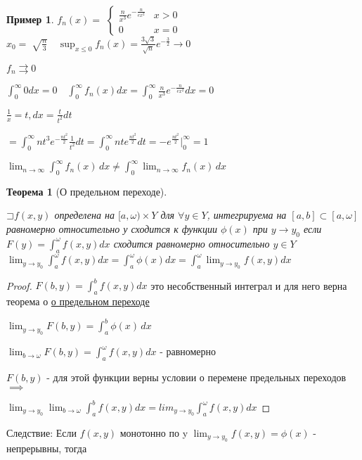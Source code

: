 \documentclass[a4paper, 12pt]{article}
\newcommand\letsymbol{\mathord{\sqsupset}}
\newtheorem{theorem}{Теорема}[section]
\theoremstyle{definition}
\newtheorem*{example}{Пример}
\theoremstyle{remark}
\begin{document}
\begin{example}
     $f_n(x) = $
     $\begin{cases}
          \frac{n}{x^3}e^{-\frac{n}{ex^2}} &\text{$x>0$}\\
          0 &\text{$x = 0$}
        \end{cases}$
     $x_0 = \sqrt[]{\frac{n}{3}}\quad \sup_{x\leq 0}f_n(x) = \frac{3\sqrt{3}}{\sqrt{n}}e^{-\frac{3}{2}}\to 0$

     $f_n\rightrightarrows 0$

     $\int_0^\infty 0dx = 0\quad \int_0^\infty f_n(x) dx = \int_0^\infty \frac{n}{x^3}e^{-\frac{n}{ex^2}}dx = 0$

     $\frac{1}{x} = t, dx = \frac{t}{t^2}dt$

     $=  \int_0^\infty nt^3 e^{-\frac{nt^2}{2}}\frac{1}{t^2}dt =  \int_0^\infty nte^{\frac{nt^2}{2}}dt = - e^{\frac{nt^2}{2}}{\Bigg |}_0^\infty = 1$

     $\lim_{n \to \infty}  \int_{0}^{\infty} f_n(x) \,dx \neq \int_{0}^{\infty} \lim_{n \to \infty}f_n(x) \,dx$
\end{example}

\begin{theorem}[О предельном переходе] \hypertarget{p4}{}
     $\letsymbol{}f(x,y)$ определена на $[a,\omega)\times Y$ для $\forall y\in Y$, интегрируема на $[a,b]\subset[a, \omega]$ равномерно относительно у сходится к функции $\phi(x)$ при $y\to y_0$ если $F(y) = \int_a^\omega f(x,y)dx$ 
     сходится равномерно относительно $y\in Y$
     $\lim_{y \to y_0}  \int_a^\omega  f(x,y)dx = \int_a^\omega  \phi(x)dx = \int_a^\omega  \lim_{y \to y_0}  f(x,y)dx$ 
\end{theorem}

\begin{proof}
     $F(b, y) = \int_a^b f(x,y)dx$ это несобственный интеграл и для него верна теорема о \hyperlink{p2}{о предельном переходе}

     $\lim_{y \to y_0}F(b, y) = \int_{a}^{b} \phi(x) \,dx $

     $\lim_{b\to \omega}F(b, y) = \int_a^\omega f(x,y)dx$ - равномерно

     $F(b,y)$ - для этой функции верны условии о перемене предельных переходов $\implies$

     $\lim_{y \to y_0} \lim_{b \to \omega} \int_a^b f(x,y)dx = lim_{y \to y_0} \int_a^\omega f(x,y)dx$
\end{proof}
Следствие:
Если $f(x,y)$ монотонно по y $\lim_{y \to y_0}  f(x,y) = \phi(x)$ - непрерывны, тогда
\end{document}

